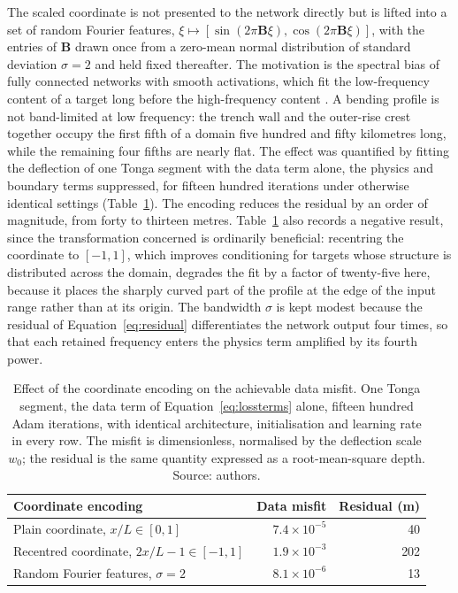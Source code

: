 \documentclass[final]{agujournal2019}
\begin{document}
The scaled coordinate is not presented to the network directly but is lifted
into a set of random Fourier features, $\xi \mapsto [\sin(2\pi\mathbf{B}\xi),
\cos(2\pi\mathbf{B}\xi)]$, with the entries of $\mathbf{B}$ drawn once from a
zero-mean normal distribution of standard deviation $\sigma = 2$ and held fixed
thereafter. The motivation is the spectral bias of fully connected networks with
smooth activations, which fit the low-frequency content of a target long before
the high-frequency content \cite{Raissi2019,Karniadakis2021}. A bending profile
is not band-limited at low frequency: the trench wall and the outer-rise crest
together occupy the first fifth of a domain five hundred and fifty kilometres
long, while the remaining four fifths are nearly flat. The effect was quantified
by fitting the deflection of one Tonga segment with the data term alone, the
physics and boundary terms suppressed, for fifteen hundred iterations under
otherwise identical settings (Table~\ref{tab:encoding}). The encoding reduces
the residual by an order of magnitude, from forty to thirteen metres.
Table~\ref{tab:encoding} also records a negative result, since the
transformation concerned is ordinarily beneficial: recentring the coordinate to
$[-1,1]$, which improves conditioning for targets whose structure is distributed
across the domain, degrades the fit by a factor of twenty-five here, because it
places the sharply curved part of the profile at the edge of the input range
rather than at its origin. The bandwidth $\sigma$ is kept modest because the
residual of Equation~\eqref{eq:residual} differentiates the network output four
times, so that each retained frequency enters the physics term amplified by its
fourth power.

\begin{table}\centering
  \caption{Effect of the coordinate encoding on the achievable data misfit.
  One Tonga segment, the data term of Equation~\eqref{eq:lossterms} alone,
  fifteen hundred Adam iterations, with identical architecture, initialisation
  and learning rate in every row. The misfit is dimensionless, normalised by
  the deflection scale $w_{0}$; the residual is the same quantity expressed as
  a root-mean-square depth. Source: authors.}
  \label{tab:encoding}
  \begin{tabular}{lrr}
    \toprule
    Coordinate encoding & Data misfit & Residual (m) \\
    \midrule
    Plain coordinate, $x/L \in [0,1]$         & $7.4 \times 10^{-5}$ & 40 \\
    Recentred coordinate, $2x/L-1 \in [-1,1]$ & $1.9 \times 10^{-3}$ & 202 \\
    Random Fourier features, $\sigma = 2$     & $8.1 \times 10^{-6}$ & 13 \\
    \bottomrule
  \end{tabular}
\end{table}
\end{document}
